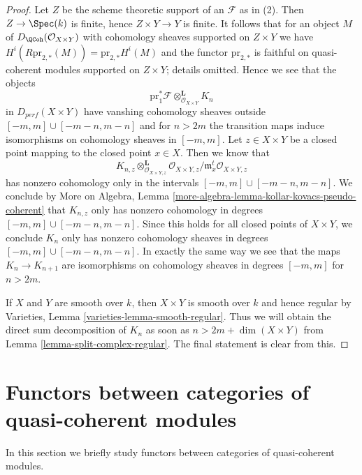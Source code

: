 \begin{proof}
Let $Z$ be the scheme theoretic support of an $\mathcal{F}$ as in (2).
Then $Z \to \Spec(k)$ is finite, hence $Z \times Y \to Y$ is finite.
It follows that for an object $M$ of $D_\QCoh(\mathcal{O}_{X \times Y})$
with cohomology sheaves supported on $Z \times Y$ we have
$H^i(R\text{pr}_{2, *}(M)) = \text{pr}_{2, *}H^i(M)$ and the functor
$\text{pr}_{2, *}$ is faithful on quasi-coherent modules supported
on $Z \times Y$; details omitted. Hence we see that the objects
$$
\text{pr}_1^*\mathcal{F} \otimes_{\mathcal{O}_{X \times Y}}^\mathbf{L} K_n
$$
in $D_{perf}(X \times Y)$ have vanshing cohomology sheaves outside
$[-m, m] \cup [-m - n, m - n]$ and for $n > 2m$ the transition maps
induce isomorphisms on cohomology sheaves in $[-m, m]$.
Let $z \in X \times Y$ be a closed point mapping to the closed point
$x \in X$. Then we know that
$$
K_{n, z} \otimes_{\mathcal{O}_{X \times Y, z}}^\mathbf{L}
\mathcal{O}_{X \times Y, z}/\mathfrak m_x^t\mathcal{O}_{X \times Y, z}
$$
has nonzero cohomology only in the intervals
$[-m, m] \cup [-m - n, m - n]$.
We conclude by More on Algebra, Lemma
\ref{more-algebra-lemma-kollar-kovacs-pseudo-coherent}
that $K_{n, z}$ only has nonzero cohomology
in degrees $[-m, m] \cup [-m - n, m - n]$. Since this holds for all
closed points of $X \times Y$, we conclude $K_n$ only has nonzero
cohomology sheaves in degrees $[-m, m] \cup [-m - n, m - n]$.
In exactly the same way we see that the maps $K_n \to K_{n + 1}$
are isomorphisms on cohomology sheaves in degrees $[-m, m]$
for $n > 2m$.

\medskip\noindent
If $X$ and $Y$ are smooth over $k$, then $X \times Y$ is smooth
over $k$ and hence regular by
Varieties, Lemma \ref{varieties-lemma-smooth-regular}.
Thus we will obtain the direct sum decomposition of $K_n$
as soon as $n > 2m + \dim(X \times Y)$ from
Lemma \ref{lemma-split-complex-regular}. The final statement
is clear from this.
\end{proof}









\section{Functors between categories of quasi-coherent modules}
\label{section-functor-quasi-coherent}

\noindent
In this section we briefly study functors between categories of
quasi-coherent modules.

